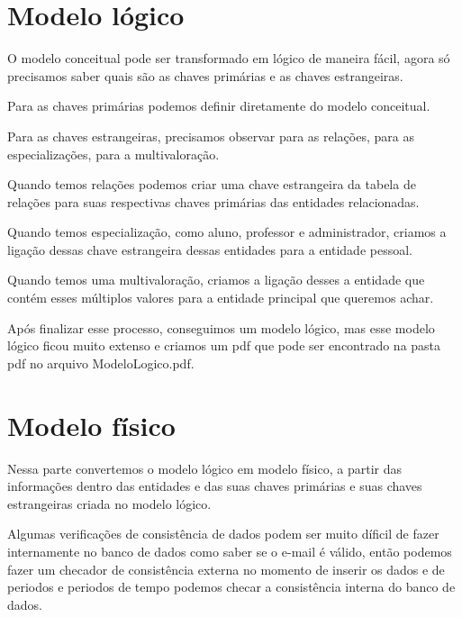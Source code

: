 \documentclass{report}
\begin{document}
\section{Modelo lógico}

O modelo conceitual pode ser transformado em lógico de maneira fácil, agora só precisamos saber quais são as chaves primárias e as chaves estrangeiras.

Para as chaves primárias podemos definir diretamente do modelo conceitual.

Para as chaves estrangeiras, precisamos observar para as relações, para as especializações, para a multivaloração.

Quando temos relações podemos criar uma chave estrangeira da tabela de relações para suas respectivas chaves primárias das entidades relacionadas.

Quando temos especialização, como aluno, professor e administrador, criamos a ligação dessas chave estrangeira dessas entidades para a entidade pessoal.

Quando temos uma multivaloração, criamos a ligação desses a entidade que contém esses múltiplos valores para a entidade principal que queremos achar.

Após finalizar esse processo, conseguimos um modelo lógico, mas esse modelo lógico ficou muito extenso e criamos um pdf que pode ser encontrado na pasta pdf no arquivo ModeloLogico.pdf.



\section{Modelo físico}
Nessa parte convertemos o modelo lógico em modelo físico, a partir das informações dentro das entidades e das suas chaves primárias e suas chaves estrangeiras criada no modelo lógico.

Algumas verificações de consistência de dados podem ser muito díficil de fazer internamente no banco de dados como saber se o e-mail é válido, então podemos fazer um checador de consistência externa no momento de inserir os dados e de periodos e periodos de tempo podemos checar a consistência interna do banco de dados.
\end{document}
